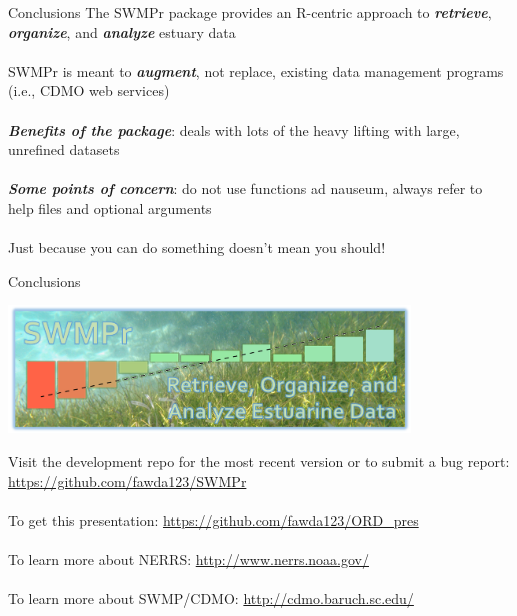 \documentclass[serif]{beamer}\usepackage[]{graphicx}\usepackage[]{color}
\newcommand{\Bigtxt}[1]{\textbf{\textit{#1}}}
\begin{document}
\begin{frame}{Conclusions}
The SWMPr package provides an R-centric approach to \Bigtxt{retrieve}, \Bigtxt{organize}, and \Bigtxt{analyze} estuary data \\~\\
SWMPr is meant to \Bigtxt{augment}, not replace, existing data management programs (i.e., CDMO web services) \\~\\
\Bigtxt{Benefits of the package}: deals with lots of the heavy lifting with large, unrefined datasets \\~\\
\Bigtxt{Some points of concern}: do not use functions ad nauseum, always refer to help files and optional arguments\\~\\
Just because you can do something doesn't mean you should!
\end{frame}

\begin{frame}{Conclusions}
\centerline{\includegraphics[width = 0.8\textwidth]{fig/swmpr_logo.png}}
\vspace{0.15in}
Visit the development repo for the most recent version or to submit a bug report: \href{https://github.com/fawda123/SWMPr}{https://github.com/fawda123/SWMPr}\\~\\
To get this presentation: \href{https://github.com/fawda123/swmpr_pres}{https://github.com/fawda123/ORD\_pres} \\~\\
To learn more about NERRS: \href{http://www.nerrs.noaa.gov/}{http://www.nerrs.noaa.gov/} \\~\\
To learn more about SWMP/CDMO: \href{http://cdmo.baruch.sc.edu/}{http://cdmo.baruch.sc.edu/}
\end{frame}
\end{document}
